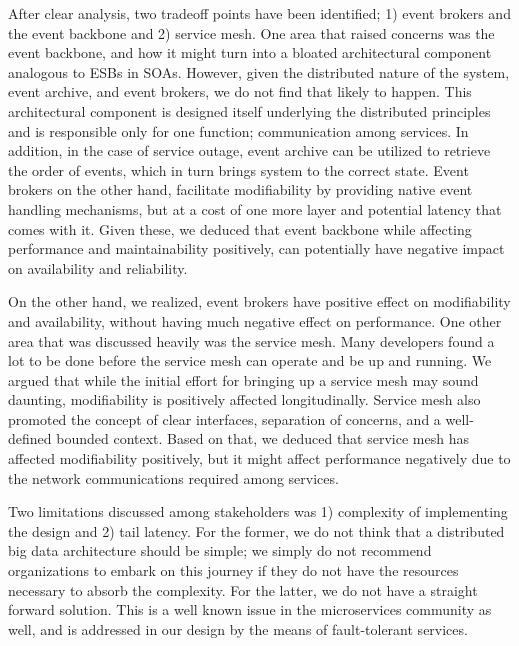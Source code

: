 \documentclass[conference]{IEEEtran}
\begin{document}
After clear analysis, two tradeoff points have been identified; 1) event brokers and the event backbone and 2) service mesh. One area that raised concerns was the event backbone, and how it might turn into a bloated architectural component analogous to ESBs in SOAs. However, given the distributed nature of the system, event archive, and event brokers, we do not find that likely to happen. This architectural component is designed itself underlying the distributed principles and is responsible only for one function; communication among services. In addition, in the case of service outage, event archive can be utilized to retrieve the order of events, which in turn brings system to the correct state. Event brokers on the other hand, facilitate modifiability by providing native event handling mechanisms, but at a cost of one more layer and potential latency that comes with it. Given these, we deduced that event backbone while affecting performance and maintainability positively, can potentially have negative impact on availability and reliability. 
 
On the other hand, we realized, event brokers have positive effect on modifiability and availability, without having much negative effect on performance. One other area that was discussed heavily was the service mesh. Many developers found a lot to be done before the service mesh can operate and be up and running. We argued that while the initial effort for bringing up a service mesh may sound daunting, modifiability is positively affected longitudinally. Service mesh also promoted the concept of clear interfaces, separation of concerns, and a well-defined bounded context. Based on that, we deduced that service mesh has affected modifiability positively, but it might affect performance negatively due to the network communications required among services. 


 
 Two limitations discussed among stakeholders was 1) complexity of implementing the design and 2) tail latency. For the former, we do not think that a distributed big data architecture should be simple; we simply do not recommend organizations to embark on this journey if they do not have the resources necessary to absorb the complexity. For the latter, we do not have a straight forward solution. This is a well known issue in the microservices community as well, and is addressed in our design by the means of fault-tolerant services.  
\end{document}
